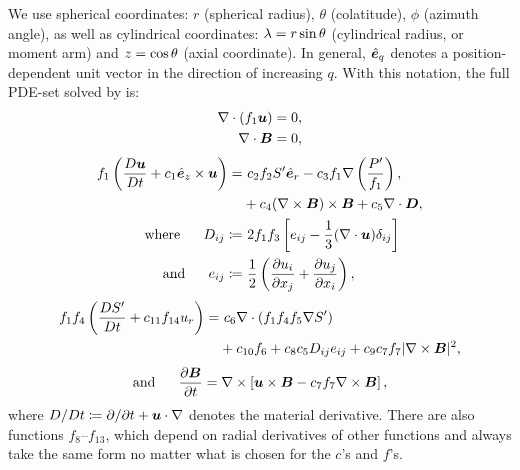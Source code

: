 \documentclass[12pt]{article}
\numberwithin{equation}{section}
\begin{document}
	We use spherical coordinates: $r$ (spherical radius), $\theta$ (colatitude), $\phi$ (azimuth angle), as well as cylindrical coordinates: $\lambda=r\sin\theta$ (cylindrical radius, or moment arm) and $z=\cos\theta$ (axial coordinate). In general, $\hat{\bm{e}}_q$ denotes a position-dependent unit vector in the direction of increasing $q$. With this notation, the full PDE-set solved by {\rayleigh} is:
	\begin{align}
	\nabla\cdot(f_1\bm{u}) &= 0\label{eq:contgen},\\
	\nabla\cdot \bm{B} &= 0,
\end{align}
\begin{subequations}\label{eq:momgen}
	\begin{align}
		f_1\left(\matderiv{\vecu}+c_1\ez\times\vecu\right) =&\ c_2f_2 \entrprime\er - c_3 f_1\nabla\left(\frac{\prsprime}{f_1} \right), \nonumber\\
		& +c_4(\curl\vecb)\times\vecb+c_5\Div\bm{D},\\
		\where D_{ij} \define&\ 2f_1 f_3 \left[e_{ij} - \frac{1}{3}(\Div\vecu) \delta_{ij} \right]\label{eq:dstressgen}\\
		\andd e_{ij} \define&\ \frac{1}{2}\left(\pderiv{u_i}{x_j} + \pderiv{u_j}{x_i} \right),\label{eq:estressgen}
	\end{align}
\end{subequations}
\begin{align}\label{eq:engen}
	f_1 f_4 \left(\frac{D{S^\prime}}{Dt} + c_{11}f_{14} u_r\right) =&\ c_6\nabla\cdot(f_1 f_4 f_5 \nabla {S^\prime}) \nonumber \\
	&+ c_{10}f_6 + c_8 c_5 D_{ij}e_{ij} +c_9c_7f_7|\nabla\times\bm{B}|^2,
\end{align}
\begin{align}\label{eq:indgen}
	\text{and}\ \ \ \ \  \frac{\partial\bm{B}}{\partial t} = \nabla\times\left[\bm{u}\times\bm{B} - c_7 f_7\nabla\times\bm{B}\right],
\end{align}
where $D/Dt\coloneqq \partial/\partial t+\bm{u}\cdot\nabla$ denotes the material derivative. There are also functions $f_8$--$f_{13}$, which depend on radial derivatives of other functions and always take the same form no matter what is chosen for the $c$'s and $f$'s. 
\end{document}
